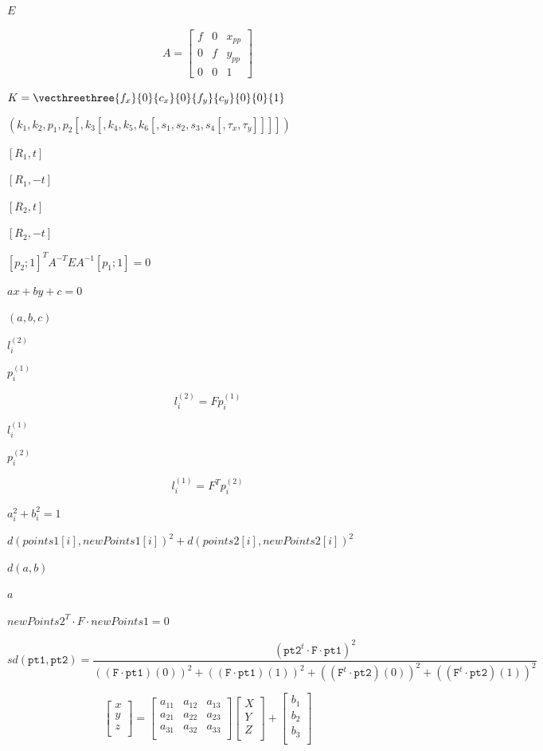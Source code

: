 \documentclass{article}
\begin{document}
$E$
\pagebreak

\[A =
\begin{bmatrix}
f & 0 & x_{pp}  \\
0 & f & y_{pp}  \\
0 & 0 & 1
\end{bmatrix}\]
\pagebreak

$K = \vecthreethree{f_x}{0}{c_x}{0}{f_y}{c_y}{0}{0}{1}$
\pagebreak

$(k_1, k_2, p_1, p_2[, k_3[, k_4, k_5, k_6[, s_1, s_2, s_3, s_4[, \tau_x, \tau_y]]]])$
\pagebreak

$[R_1, t]$
\pagebreak

$[R_1, -t]$
\pagebreak

$[R_2, t]$
\pagebreak

$[R_2, -t]$
\pagebreak

$[p_2; 1]^T A^{-T} E A^{-1} [p_1; 1] = 0$
\pagebreak

$ax + by + c=0$
\pagebreak

$(a, b, c)$
\pagebreak

$l^{(2)}_i$
\pagebreak

$p^{(1)}_i$
\pagebreak

\[l^{(2)}_i = F p^{(1)}_i\]
\pagebreak

$l^{(1)}_i$
\pagebreak

$p^{(2)}_i$
\pagebreak

\[l^{(1)}_i = F^T p^{(2)}_i\]
\pagebreak

$a_i^2+b_i^2=1$
\pagebreak

$d(points1[i], newPoints1[i])^2 + d(points2[i],newPoints2[i])^2$
\pagebreak

$d(a,b)$
\pagebreak

$a$
\pagebreak

$newPoints2^T \cdot F \cdot newPoints1 = 0$
\pagebreak

\[sd( \texttt{pt1} , \texttt{pt2} )=
\frac{(\texttt{pt2}^t \cdot \texttt{F} \cdot \texttt{pt1})^2}
{((\texttt{F} \cdot \texttt{pt1})(0))^2 +
((\texttt{F} \cdot \texttt{pt1})(1))^2 +
((\texttt{F}^t \cdot \texttt{pt2})(0))^2 +
((\texttt{F}^t \cdot \texttt{pt2})(1))^2}
\]
\pagebreak

\[\begin{bmatrix}
x\\
y\\
z\\
\end{bmatrix}
=
\begin{bmatrix}
a_{11} & a_{12} & a_{13}\\
a_{21} & a_{22} & a_{23}\\
a_{31} & a_{32} & a_{33}\\
\end{bmatrix}
\begin{bmatrix}
X\\
Y\\
Z\\
\end{bmatrix}
+
\begin{bmatrix}
b_1\\
b_2\\
b_3\\
\end{bmatrix}
\]
\pagebreak
\end{document}
